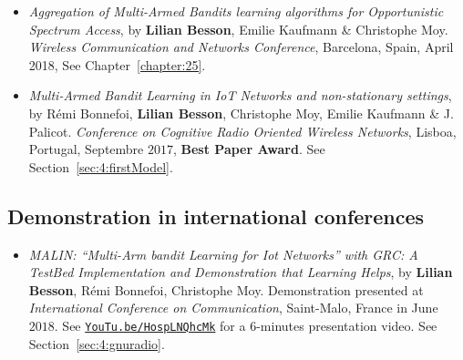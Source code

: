 \begin{itemize}
\item
    \emph{Aggregation of Multi-Armed Bandits learning algorithms for Opportunistic Spectrum Access},
    by \textbf{Lilian Besson}, Emilie Kaufmann \& Christophe Moy.
    \emph{Wireless Communication and Networks Conference},
    Barcelona, Spain, April 2018,
    See Chapter~\ref{chapter:25}.
    \cite{Besson2018WCNC}

\item
    \emph{Multi-Armed Bandit Learning in IoT Networks and non-stationary settings},
    by Rémi Bonnefoi, \textbf{Lilian Besson}, Christophe Moy, Emilie Kaufmann \& J. Palicot.
    \emph{Conference on Cognitive Radio Oriented Wireless Networks},
    Lisboa, Portugal, Septembre $2017$,
    \textbf{Best Paper Award}.
    See Section~\ref{sec:4:firstModel}.
    \cite{Bonnefoi17}

\end{itemize}

\subsection*{Demonstration in international conferences}

\begin{itemize}

\item
    \emph{MALIN: ``Multi-Arm bandit Learning for Iot Networks'' with GRC: A TestBed Implementation and Demonstration that Learning Helps},
    by \textbf{Lilian Besson}, Rémi Bonnefoi, Christophe Moy.
    Demonstration presented at \emph{International Conference on Communication},
    Saint-Malo, France in June $2018$.
    See \href{https://YouTu.be/HospLNQhcMk}{\texttt{YouTu.be/HospLNQhcMk}} for a $6$-minutes presentation video.
    See Section~\ref{sec:4:gnuradio}.
    \cite{Besson2018ICT}

\end{itemize}


